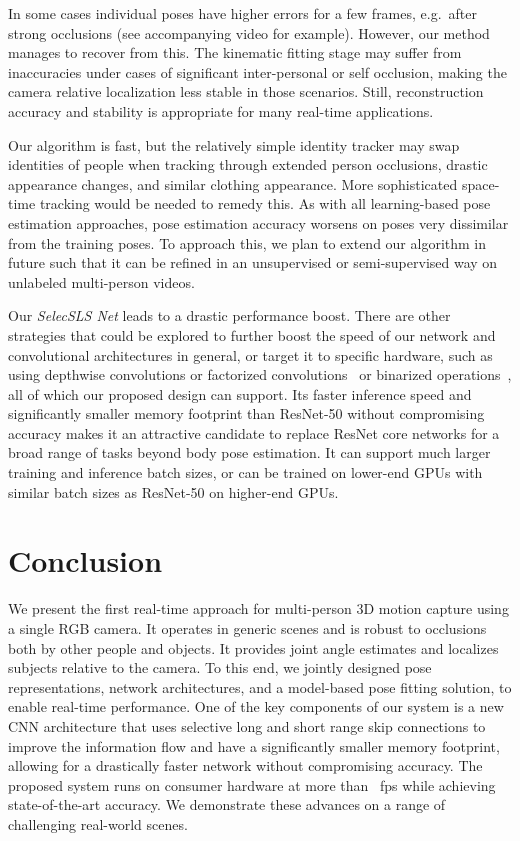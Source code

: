 \documentclass[acmtog,authorversion]{acmart}
\newcommand{\eg}{e.g.~}
\begin{document}
In some cases individual poses have higher errors for a few frames, \eg after strong occlusions (see accompanying video for example). However, our method manages to recover from this.   
The kinematic fitting stage may suffer from inaccuracies under cases of significant inter-personal or self occlusion, making the camera relative localization less stable in those scenarios.
Still, reconstruction accuracy and stability 
is appropriate for many real-time applications. 


Our algorithm is fast, but the relatively simple identity tracker may swap identities of people when tracking through extended person occlusions, drastic appearance changes, and similar clothing appearance. More sophisticated space-time tracking would be needed to remedy this. 
As with all learning-based pose estimation approaches, pose estimation accuracy worsens on poses very dissimilar from the training poses. To approach this, we plan to extend our algorithm in future such that it can be refined in an unsupervised or semi-supervised way on unlabeled multi-person videos.

Our \textit{SelecSLS Net} leads to a drastic performance boost. 
There are other strategies that could be explored to further boost the speed of our network and convolutional architectures in general, or target it to specific hardware, such as using depthwise  convolutions or factorized  convolutions~\cite{romera2018erfnet,szegedy2017inception} or binarized operations~\cite{bulat2017binarized}, all of which our proposed design can support. Its faster inference speed and significantly smaller memory footprint than ResNet-50 without compromising accuracy makes it an attractive candidate to replace ResNet core networks for a broad range of tasks beyond body pose estimation. It can support much larger training and inference batch sizes, or can be trained on lower-end GPUs with similar batch sizes as ResNet-50 on higher-end GPUs. 


\section{Conclusion}
\label{sec:conclusion}
We present the first real-time approach for multi-person 3D motion capture using a single RGB camera. It operates in generic scenes and is robust to occlusions both by other people and objects. It provides joint angle estimates and localizes subjects relative to the camera. To this end, we jointly designed pose representations, network architectures, and a model-based pose fitting solution, to enable real-time performance. One of the key components of our system is a new CNN architecture that uses selective long and short range skip connections to improve the information flow and have a significantly smaller memory footprint, allowing for a drastically faster network without compromising accuracy. The proposed system runs on consumer hardware at more than ~fps while achieving state-of-the-art accuracy. We demonstrate these advances on a range of challenging real-world scenes. 
 
\end{document}

